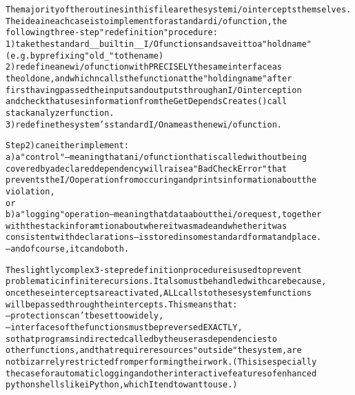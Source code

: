 \begin{alltt}
The majority of the routines in this file are the system i/o intercepts themselves.  
The idea in each case is to implement for a standard i/o function, the
following three-step "redefinition" procedure: 
        1) take the standard \_\_builtin\_\_ I/O functions and save it to a "hold name" 
                (e.g. by prefixing "old\_" to the name)
        2) redefine a new i/o function with PRECISELY the same interface as 
                the old one, and whichn calls the function at the "holding name" after
                first having passed the inputs and outputs through an I/O interception 
                and check that uses information from the GetDependsCreates() call 
                stack analyzer function. 
        3) redefine the system's standard I/O name as the new i/o function.
        
Step 2) can either implement:
        a) a "control" -- meaning that an i/o function that is called without being 
                covered by a declared dependency will raise a "BadCheckError" that
                prevents the I/O operation from occuring and prints information about the 
                violation, 
or 
        b) a "logging" operation -- meaning that data about the i/o request, together 
                with the stack inforamtion about where it was made and whether it was
                consistent with declarations -- is stored in some standard format and place.
-- and of course, it can do both.  

The slightly complex 3-step redefinition procedure is used to prevent 
problematic infinite recursions.  It also must be handled with care because,
once these intercepts are activated, ALL calls to these system functions 
will be passed through the intercepts.   This means that:
        -- protections can't be set too widely,
        -- interfaces of the functions must be preversed EXACTLY,
so that programs indirected called by the user as dependencies to 
other functions, and that require resources "outside" the system, are 
not bizarrely restricted from performing their work. (This is especially 
the case for automatic logging and other interactive features of enhanced 
python shells like iPython, which I tend to want to use.) 
\end{alltt}



